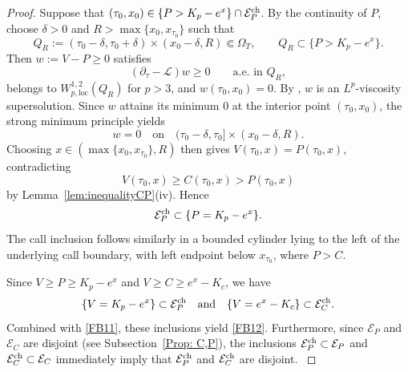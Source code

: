 \documentclass[11pt, a4paper, leqno]{amsart}
\numberwithin{equation}{section}
\theoremstyle{plain}
\theoremstyle{definition}
\theoremstyle{remark}
\def\ge{\geqslant}
\begin{document}
\begin{proof}

{
Suppose that
$(\tau_0,x_0)\in\{P>K_p-e^x\}\cap\mathcal E_P^{\rm ch}$.
By the continuity of $P$,
choose $\delta>0$ and $R>\max\{x_0,x_{\tau_0}\}$ such that
\[
    Q_R:=(\tau_0-\delta,\tau_0+\delta)\times(x_0-\delta,R)
    \Subset\Omega_T,
    \qquad
    Q_R\subset\{P>K_p-e^x\}.
\]
Then $w:=V-P\ge0$ satisfies
\[
    (\partial_\tau-\mathcal L)w\ge0
    \qquad\text{a.e. in }Q_R,
\]
belongs to $W_{p,\mathrm{loc}}^{1,2}(Q_R)$ for $p>3$, and
$w(\tau_0,x_0)=0$.
By \cite[Proposition~2.11]{CRAN00}, $w$ is an
$L^p$-viscosity supersolution. Since $w$ attains its minimum $0$
at the interior point $(\tau_0,x_0)$, the strong minimum principle
\cite[Corollary~2.4]{FRA04} yields
\[
    w=0
    \quad\text{on}\quad
    (\tau_0-\delta,\tau_0]\times(x_0-\delta,R).
\]
Choosing
$x\in(\max\{x_0,x_{\tau_0}\},R)$ then gives
$V(\tau_0,x)=P(\tau_0,x)$, contradicting
\[
    V(\tau_0,x)\ge C(\tau_0,x)>P(\tau_0,x)
\]
by Lemma~\ref{lem:inequalityCP}(iv).
Hence
\[
    \mathcal E_P^{\rm ch}\subset\{P=K_p-e^x\}.
\]
The call inclusion follows similarly in a bounded cylinder lying to the
left of the underlying call boundary, with left endpoint below
$x_{\tau_0}$, where $P>C$.}

Since $V \ge P \ge K_p - e^x$ and $V \ge C \ge e^x - K_c$, we have
\[
    \{V = K_p - e^x\} \subset \mathcal{E}_P^{\rm ch}
    \quad \text{and} \quad
    \{V = e^x - K_c\} \subset \mathcal{E}_C^{\rm ch}.
\]
Combined with \eqref{FB11}, these inclusions yield \eqref{FB12}.
Furthermore, since $\mathcal{E}_P$ and $\mathcal{E}_C$ are disjoint
(see Subsection~\ref{Prop: C,P}), the inclusions
$\mathcal{E}_P^{\rm ch} \subset \mathcal{E}_P$ and
$\mathcal{E}_C^{\rm ch} \subset \mathcal{E}_C$ immediately imply that
$\mathcal{E}_P^{\rm ch}$ and $\mathcal{E}_C^{\rm ch}$ are disjoint.
\label{rev:inclusion-end}
\end{proof}
\end{document}
